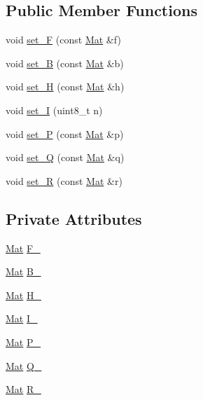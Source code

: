 \subsection*{Public Member Functions}
\begin{DoxyCompactItemize}
\item 
void \mbox{\hyperlink{struct_kalman___vars_aaa0914f751fcdac78284162f6c8c2a74}{set\+\_\+F}} (const \mbox{\hyperlink{class_mat}{Mat}} \&f)
\item 
void \mbox{\hyperlink{struct_kalman___vars_a7e2b8d6cf9ecb4b3ac722eed4a5a8c5a}{set\+\_\+B}} (const \mbox{\hyperlink{class_mat}{Mat}} \&b)
\item 
void \mbox{\hyperlink{struct_kalman___vars_ac46252628322507a132ae399227a6d18}{set\+\_\+H}} (const \mbox{\hyperlink{class_mat}{Mat}} \&h)
\item 
void \mbox{\hyperlink{struct_kalman___vars_a9c818fcb9d72defe273c99a5378319ee}{set\+\_\+I}} (uint8\+\_\+t n)
\item 
void \mbox{\hyperlink{struct_kalman___vars_a5c294937351709594ffc9c41cb183087}{set\+\_\+P}} (const \mbox{\hyperlink{class_mat}{Mat}} \&p)
\item 
void \mbox{\hyperlink{struct_kalman___vars_aa19db0dc8a5b4d7f0db1cd18ecc20a7d}{set\+\_\+Q}} (const \mbox{\hyperlink{class_mat}{Mat}} \&q)
\item 
void \mbox{\hyperlink{struct_kalman___vars_a49e035a9f13c4b45fd77215a8bc95309}{set\+\_\+R}} (const \mbox{\hyperlink{class_mat}{Mat}} \&r)
\end{DoxyCompactItemize}
\subsection*{Private Attributes}
\begin{DoxyCompactItemize}
\item 
\mbox{\hyperlink{class_mat}{Mat}} \mbox{\hyperlink{struct_kalman___vars_a778fcb01c321bd6a4be499a887564b61}{F\+\_\+}}
\item 
\mbox{\hyperlink{class_mat}{Mat}} \mbox{\hyperlink{struct_kalman___vars_a5bb76dcb78368487e483d58a1d704fe5}{B\+\_\+}}
\item 
\mbox{\hyperlink{class_mat}{Mat}} \mbox{\hyperlink{struct_kalman___vars_aa3c8b7e514104a7c02ed2ff162fbf72b}{H\+\_\+}}
\item 
\mbox{\hyperlink{class_mat}{Mat}} \mbox{\hyperlink{struct_kalman___vars_a9e4cf8a3666afd962e6556a68d3deea8}{I\+\_\+}}
\item 
\mbox{\hyperlink{class_mat}{Mat}} \mbox{\hyperlink{struct_kalman___vars_a8e744f7c2e3ef0a02bc91b8bf00f2ecb}{P\+\_\+}}
\item 
\mbox{\hyperlink{class_mat}{Mat}} \mbox{\hyperlink{struct_kalman___vars_ae4a9e7062e833d0660efc4a46c837231}{Q\+\_\+}}
\item 
\mbox{\hyperlink{class_mat}{Mat}} \mbox{\hyperlink{struct_kalman___vars_ab9591fff75edb672a2f7e3b856581dbe}{R\+\_\+}}
\end{DoxyCompactItemize}
